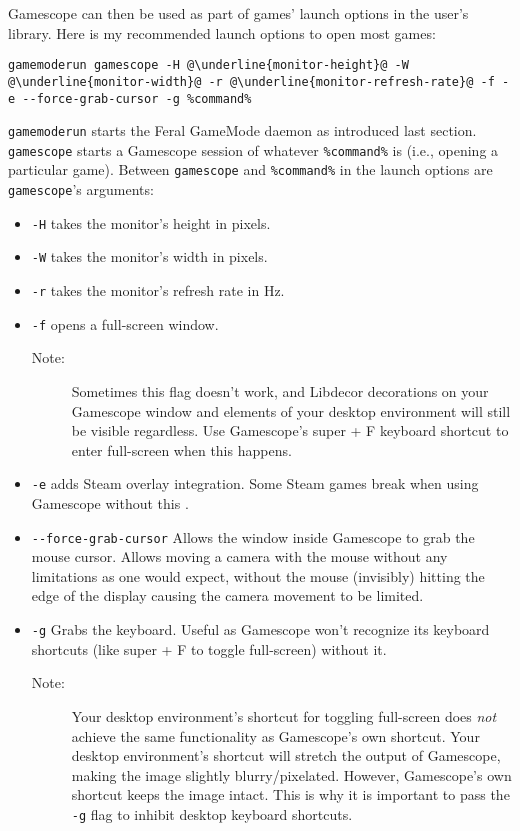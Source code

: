 \documentclass[a4paper]{article}
\begin{document}
Gamescope can then be used as part of games' launch options in the user's library.
Here is my recommended launch options to open most games:
\begin{lstlisting}[escapechar=@]
gamemoderun gamescope -H @\underline{monitor-height}@ -W @\underline{monitor-width}@ -r @\underline{monitor-refresh-rate}@ -f -e --force-grab-cursor -g %command%
\end{lstlisting}
\lstinline|gamemoderun| starts the Feral GameMode daemon as introduced last section.
\lstinline|gamescope| starts a Gamescope session of whatever \lstinline|%command%| is (i.e., opening a particular game).
Between \lstinline|gamescope| and \lstinline|%command%| in the launch options are \lstinline|gamescope|'s arguments:
\begin{itemize}
    \item \lstinline|-H| takes the monitor's height in pixels.
    \item \lstinline|-W| takes the monitor's width in pixels.
    \item \lstinline|-r| takes the monitor's refresh rate in Hz.
    \item \lstinline|-f| opens a full-screen window.
    \begin{description}
        \item[Note:] Sometimes this flag doesn't work, and Libdecor decorations on your Gamescope window and elements of your desktop environment will still be visible regardless. Use Gamescope's super + F keyboard shortcut to enter full-screen when this happens.
    \end{description}
    \item \lstinline|-e| adds Steam overlay integration. Some Steam games break when using Gamescope without this \cite{arch-wiki-gamescope}.
    \item \lstinline|--force-grab-cursor| Allows the window inside Gamescope to grab the mouse cursor. Allows moving a camera with the mouse without any limitations as one would expect, without the mouse (invisibly) hitting the edge of the display causing the camera movement to be limited.
    \item \lstinline|-g| Grabs the keyboard. Useful as Gamescope won't recognize its keyboard shortcuts (like super + F to toggle full-screen) without it.
    \begin{description}
        \item[Note:] Your desktop environment's shortcut for toggling full-screen does \emph{not} achieve the same functionality as Gamescope's own shortcut. Your desktop environment's shortcut will stretch the output of Gamescope, making the image slightly blurry/pixelated. However, Gamescope's own shortcut keeps the image intact. This is why it is important to pass the \lstinline|-g| flag to inhibit desktop keyboard shortcuts.
    \end{description}
\end{itemize}
\end{document}
